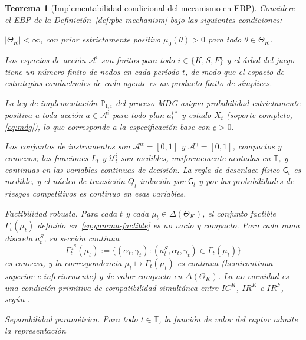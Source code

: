 \documentclass[pdflatex,sn-mathphys-ay]{sn-jnl}
\theoremstyle{thmstyleone}
\newtheorem{theorem}{Teorema}
\theoremstyle{thmstyletwo}
\theoremstyle{thmstylethree}
\newcommand{\ThetaK}{\Theta_K}
\newcommand{\1}{\mathbf{1}}
\newcommand{\ProbI}[1]{\mathbb{P}_{\mathrm{I},#1}}
\begin{document}
\begin{theorem}[Implementabilidad condicional del mecanismo en EBP]\label{thm:ebp-implementabilidad}
\normalfont
Considere el EBP de la Definición~\ref{def:pbe-mechanism} bajo las siguientes condiciones:
\begin{list}{}{\setlength{\labelwidth}{2.6em}\setlength{\labelsep}{0.7em}\setlength{\leftmargin}{3.3em}\setlength{\itemindent}{0pt}\setlength{\listparindent}{0pt}\setlength{\parsep}{0pt}\setlength{\itemsep}{0.35\baselineskip}}
  \item[\textup{(i)}] $|\ThetaK|<\infty$, con prior estrictamente positivo $\mu_0(\theta)>0$ para todo $\theta\in\ThetaK$.
  \item[\textup{(ii)}] Los espacios de acción $\mathcal{A}^i$ son finitos para todo $i\in\{K,S,F\}$ y el árbol del juego tiene un número finito de nodos en cada período $t$, de modo que el espacio de estrategias conductuales de cada agente es un producto finito de símplices.
  \item[\textup{(iii)}] La ley de implementación $\ProbI{i}$ del proceso MDG asigna probabilidad estrictamente positiva a toda acción $a\in\mathcal{A}^i$ para todo plan $a_t^{i\ast}$ y estado $X_t$ \textup{(}soporte completo, \eqref{eq:mdg}\textup{)}, lo que corresponde a la especificación base con $\underline{c}>0$.
  \item[\textup{(iv)}] Los conjuntos de instrumentos son $\mathcal{A}^{\alpha}=[0,1]$ y $\mathcal{A}^{\gamma}=[0,1]$, compactos y convexos; las funciones $L_t$ y $\mathcal{U}_t^i$ son medibles, uniformemente acotadas en $\mathbb{T}$, y continuas en las variables continuas de decisión. La regla de desenlace físico $\mathsf{G}_t$ es medible, y el núcleo de transición $Q_t$ inducido por $\mathsf{G}_t$ y por las probabilidades de riesgos competitivos es continuo en esas variables.
  \item[\textup{(v)}] Factibilidad robusta. Para cada $t$ y cada $\mu_t\in\Delta(\ThetaK)$, el conjunto factible $\Gamma_t(\mu_t)$ definido en~\eqref{eq:gamma-factible} es no vacío y compacto. Para cada rama discreta $a_t^S$, su sección continua
  \[
  \Gamma_t^{a^S}(\mu_t):=\{(\alpha_t,\gamma_t):(a_t^S,\alpha_t,\gamma_t)\in\Gamma_t(\mu_t)\}
  \]
  es convexa, y la correspondencia $\mu_t\mapsto\Gamma_t(\mu_t)$ es continua \textup{(}hemicontinua superior e inferiormente\textup{)} y de valor compacto en $\Delta(\ThetaK)$. La no vacuidad es una condición primitiva de compatibilidad simultánea entre $IC^K$, $IR^K$ e $IR^F$, según \citet{KadanRenySwinkels2017}.
  \item[\textup{(vi)}] Separabilidad paramétrica. Para todo $t\in\mathbb{T}$, la función de valor del captor admite la representación

\end{list}
\end{theorem}
\end{document}
